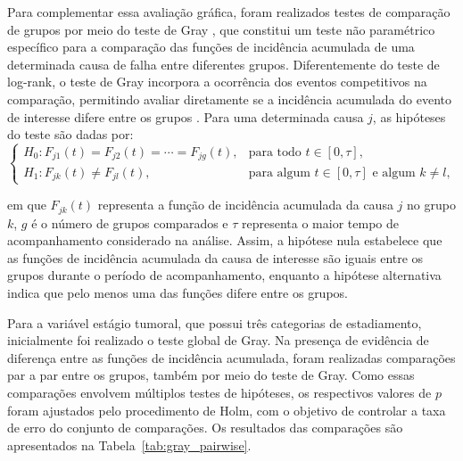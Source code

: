 \documentclass[11pt,a4paper]{article}
\begin{document}
Para complementar essa avaliação gráfica, foram realizados testes de comparação de grupos por meio do teste de Gray \citep{gray1988}, que constitui um teste não paramétrico específico para a comparação das funções de incidência acumulada de uma determinada causa de falha entre diferentes grupos. Diferentemente do teste de log-rank, o teste de Gray incorpora a ocorrência dos eventos competitivos na comparação, permitindo avaliar diretamente se a incidência acumulada do evento de interesse difere entre os grupos \citep{pintilie2006competing}. Para uma determinada causa $j$, as hipóteses do teste são dadas por:
\begin{equation*}
\begin{cases}
H_0: F_{j1}(t) = F_{j2}(t) = \cdots = F_{jg}(t),
& \text{para todo } t \in [0,\tau], \\[6pt]
H_1: F_{jk}(t) \neq F_{jl}(t),
& \text{para algum } t \in [0,\tau]
\text{ e algum } k \neq l,
\end{cases}
\end{equation*}

\noindent em que $F_{jk}(t)$ representa a função de incidência acumulada da causa $j$ no grupo $k$, $g$ é o número de grupos comparados e $\tau$ representa o maior tempo de acompanhamento considerado na análise. Assim, a hipótese nula estabelece que as funções de incidência acumulada da causa de interesse são iguais entre os grupos durante o período de acompanhamento, enquanto a hipótese alternativa indica que pelo menos uma das funções difere entre os grupos.


Para a variável estágio tumoral, que possui três categorias de estadiamento, inicialmente foi realizado o teste global de Gray. Na presença de evidência de diferença entre as funções de incidência acumulada, foram realizadas comparações par a par entre os grupos, também por meio do teste de Gray. Como essas comparações envolvem múltiplos testes de hipóteses, os respectivos valores de $p$ foram  ajustados pelo procedimento de Holm, com o objetivo de controlar a taxa de erro do conjunto de comparações. Os resultados das comparações são apresentados na Tabela~\ref{tab:gray_pairwise}.
\end{document}

